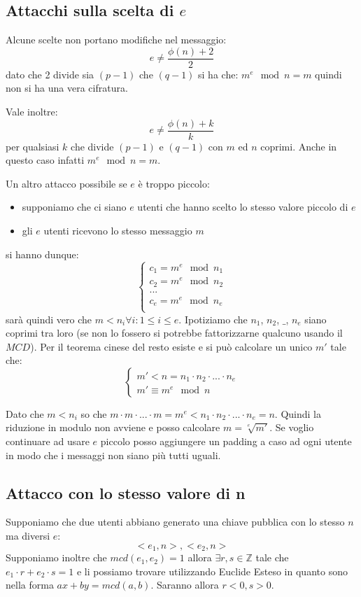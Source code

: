 \subsection{Attacchi sulla scelta di $e$}
Alcune scelte non portano modifiche nel messaggio:
$$ e \neq \frac{\phi(n) + 2}{2} $$
dato che 2 divide sia $(p-1)$ che $(q-1)$ si ha che: $ m^e \mod n = m $
quindi non si ha una vera cifratura.

Vale inoltre:
$$ e \neq \frac{\phi(n) + k}{k} $$
per qualsiasi $k$ che divide $(p-1)$ e $(q-1)$ con $m$ ed $n$ coprimi.
Anche in questo caso infatti $ m^e \mod n = m $.

Un altro attacco possibile se $e$ è troppo piccolo:
\begin{itemize}
    \item supponiamo che ci siano $e$ utenti che hanno scelto lo stesso valore piccolo di $e$
    \item gli $e$ utenti ricevono lo stesso messaggio $m$
\end{itemize}
si hanno dunque:
\begin{equation}
    \begin{cases}
    c_1 = m^e \mod n_1 \\
    c_2 = m^e \mod n_2 \\
    ... \\
    c_e = m^e \mod n_e \\
    \end{cases}
\end{equation}
sarà quindi vero che $m < n_i \forall i: 1 \leq i \leq e$.
Ipotiziamo che $n_1$, $n_2$, $\_$, $n_e$ siano coprimi tra loro (se non lo fossero si potrebbe fattorizzarne qualcuno usando il $MCD$).
Per il teorema cinese del resto esiste e si può calcolare un unico $m'$ tale che:
\begin{equation}
    \begin{cases}
    m' < n = n_1 \cdot n_2 \cdot ... \cdot n_e \\
    m' \equiv m^e \mod n
    \end{cases}
\end{equation}

Dato che $m < n_i$ so che $m \cdot m \cdot ... \cdot m = m^e < n_1 \cdot n_2 \cdot ... \cdot n_e = n$.
Quindi la riduzione in modulo non avviene e posso calcolare $m = \sqrt[e]{m'}$.
Se voglio continuare ad usare $e$ piccolo posso aggiungere un padding a caso ad ogni utente in modo che i messaggi non siano più tutti uguali.

\subsection{Attacco con lo stesso valore di n}
Supponiamo che due utenti abbiano generato una chiave pubblica con lo stesso $n$ ma diversi $e$:
$$ <e_1,n>, <e_2,n> $$
Supponiamo inoltre che $mcd(e_1, e_2) = 1$ allora $\exists r,s \in \mathbb{Z}$ tale che $e_1 \cdot r + e_2 \cdot s = 1$ e li possiamo trovare utilizzando Euclide Esteso in quanto sono nella forma $ax +by = mcd(a,b)$.
Saranno allora $r<0, s>0$.

